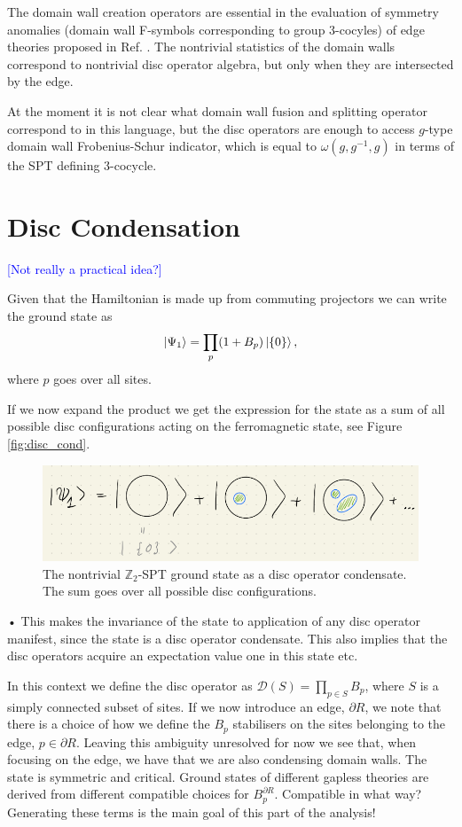 \documentclass[a4paper,twocolumn,11pt]{quantumarticle}
\newcommand{\jovan}[1]{\textcolor{blue}{[#1]}}
\begin{document}
The domain wall creation operators are essential in the evaluation of symmetry anomalies (domain wall F-symbols corresponding to group 3-cocyles) of edge theories proposed in Ref. \cite{Kawagoe_2021}. The nontrivial statistics of the domain walls correspond to nontrivial disc operator algebra, but only when they are intersected by the edge.

At the moment it is not clear what domain wall fusion and splitting operator correspond to in this language, but the disc operators are enough to access $g$-type domain wall Frobenius-Schur indicator, which is equal to $\omega(g, g^{-1}, g)$ in terms of the SPT defining 3-cocycle.

\section{Disc Condensation}

\jovan{Not really a practical idea?}

Given that the Hamiltonian is made up from commuting projectors we can write the ground state as\begin{equation}
\ket{\Psi_1} = \prod_p (1+B_p)\ket{\{0\}},
\end{equation}
where $p$ goes over all sites.

If we now expand the product we get the expression for the state as a  sum of all possible disc configurations acting on the ferromagnetic state, see Figure \ref{fig:disc_cond}.
\begin{figure}
\centering
\includegraphics[width=\linewidth]{Figures/disc_cond.png}
\caption{The nontrivial $\mathbb{Z}_2$-SPT ground state as a disc operator condensate. The sum goes over all possible disc configurations.}
\end{figure}•
This makes the invariance of the state to application of any disc operator manifest, since the state is a disc operator condensate. This also implies that the disc operators acquire an expectation value one in this state etc.

In this context we define the disc operator as $\mathcal{D}(S) = \prod_{p \in S} B_p$, where $S$ is a simply connected subset of sites. If we now introduce an edge, $\partial R$, we note that there is a choice of how we define the $B_p$ stabilisers on the sites belonging to the edge, $p \in \partial R$. Leaving this ambiguity unresolved for now we see that, when focusing on the edge, we have that we are also condensing domain walls. The state is symmetric and critical. Ground states of different gapless theories are derived from different compatible choices for $B_p^{\partial R}$. Compatible in what way? Generating these terms is the main goal of this part of the analysis!
\end{document}
